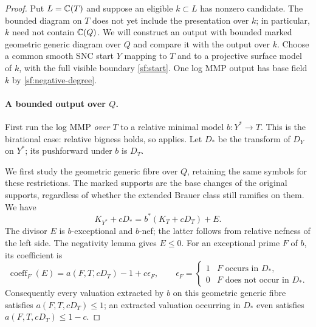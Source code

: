 \begin{proof}
Put $L=\mathbb C(T)$ and suppose an eligible $k\subset L$ has nonzero
candidate.  The bounded diagram on $T$ does not yet include the
presentation over $k$; in particular, $k$ need not contain $\mathbb C(Q)$.
We will construct an output with bounded marked geometric generic
diagram over $Q$ and compare it with the output over $k$.
Choose a common smooth
SNC start $Y$ mapping to $T$ and to a projective surface model of
$k$, with the full visible boundary \eqref{sf:start}.  One log MMP
output has base field $k$ by \eqref{sf:negative-degree}.

\paragraph{A bounded output over $Q$.}
First run the log MMP \emph{over $T$} to a relative minimal model
$b:Y^*\to T$.  This is the birational case: relative bigness holds,
so \cite[Theorem~1.2]{BCHM10} applies.  Let $D_*$ be the transform
of $D_Y$ on $Y^*$; its pushforward under $b$ is $D_T$.

We first study the geometric generic fibre over $Q$, retaining the
same symbols for these restrictions.  The marked supports
are the base changes of the original supports, regardless of whether
the extended Brauer class still ramifies on them.  We have
\begin{equation}\label{sf:exceptional-nef}
 K_{Y^*}+cD_* = b^*(K_T+cD_T)+E.
\end{equation}
The divisor $E$ is $b$-exceptional and $b$-nef; the latter follows
from relative nefness of the left side.  The negativity lemma gives
$E\leq0$.  For an exceptional prime $F$ of $b$, its coefficient is
\begin{equation}\label{sf:cutoff}
 \operatorname{coeff}_F(E)
 = a(F,T,cD_T)-1+c\epsilon_F,
 \qquad
 \epsilon_F=\begin{cases}1&F\text{ occurs in }D_*,\\0&F\text{ does not occur in }D_*.
 \end{cases}
\end{equation}
Consequently every valuation extracted by $b$ on this geometric
generic fibre satisfies
$a(F,T,cD_T)\leq1$; an extracted valuation occurring in $D_*$ even satisfies
$a(F,T,cD_T)\leq1-c$.


\end{proof}
